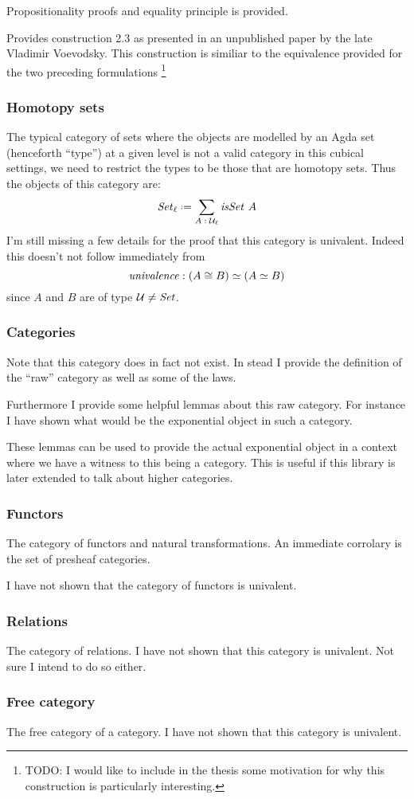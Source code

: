 Propositionality proofs and equality principle is provided.


Provides construction 2.3 as presented in an unpublished paper by the late
Vladimir Voevodsky. This construction is similiar to the equivalence provided
for the two preceding formulations
\footnote{ TODO: I would like to include in the thesis some motivation for why
  this construction is particularly interesting.}

\subsubsection{Homotopy sets}
The typical category of sets where the objects are modelled by an Agda set
(henceforth ``type'') at a given level is not a valid category in this cubical
settings, we need to restrict the types to be those that are homotopy sets. Thus the objects of this category are:
%
$$\Set_\ell \defeq \sum_{A \tp \MCU_\ell} \isSet\ A$$
%
\WIP{} I'm still missing a few details for the proof that this category is
univalent. Indeed this doesn't not follow immediately from
%
$$\mathit{univalence} \;\mathord{:}\; (A \cong B) \simeq (A \simeq B)$$
%
since $A$ and $B$ are of type $\mathcal{U} \neq \mathit{Set}$.
\subsubsection{Categories}
Note that this category does in fact not exist. In stead I provide the
definition of the ``raw'' category as well as some of the laws.

Furthermore I provide some helpful lemmas about this raw category. For instance
I have shown what would be the exponential object in such a category.

These lemmas can be used to provide the actual exponential object in a context
where we have a witness to this being a category. This is useful if this library
is later extended to talk about higher categories.

\subsubsection{Functors}
The category of functors and natural transformations. An immediate corrolary is
the set of presheaf categories.

\WIP{} I have not shown that the category of functors is univalent.

\subsubsection{Relations}
The category of relations. \WIP I have not shown that this category is
univalent. Not sure I intend to do so either.

\subsubsection{Free category}
The free category of a category. \WIP I have not shown that this category is
univalent.
